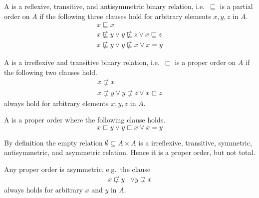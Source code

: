 

\begin{definition}
	A  is a reflexive, transitive, and antisymmetric binary relation,
	i.e.~\( \sqsubseteq \) is a partial order on \( A \) if
	the following three clauses hold for arbitrary elements \( x,y,z \) in \( A \).
	\begin{align*}
	x\sqsubseteq x
	\tag*{reflexivivity}
	\\
	x\not\sqsubseteq y \lor  y \not\sqsubseteq z \lor x\sqsubseteq z
	\tag*{transitivity}
	\\
	x\not\sqsubseteq y \lor y\not\sqsubseteq x \lor x = y
	\tag*{antisymmetry}
	\end{align*}
\end{definition}

\begin{definition}
	A  is a irreflexive and transitive binary relation,
	i.e.~\( \sqsubset \) is a proper order on \( A \) if the following two clauses hold.
	\begin{align*}
	x\not\sqsubset x
	\tag*{irreflexivivity}
	\\
	x\not\sqsubset y \lor  y \not\sqsubset z \lor x\sqsubset z
	\tag*{transitivity}
	\end{align*}
	always hold for arbitrary elements \( x,y,z \) in \( A \).
\end{definition}

\begin{definition}
	A  is a proper order where the following clause holds.
	\[
		x \sqsubset y \lor y \sqsubset x  \lor x=y \tag*{totality}
	\]
\end{definition}

\begin{example}
	By definition the empty relation \( \emptyset \subseteq A \times A \) is a
	irreflexive,
	transitive,
	symmetric,
	antisymmetric,
	and asymmetric
	relation.
	Hence it is a proper order, but not total.
\end{example}

\begin{lemma}
	Any proper order is asymmetric, e.g.~the clause
	\begin{align*}
	x\not\sqsubset y &\lor y\not\sqsubset x \tag*{asymmetry}
	\end{align*}
	always holds for arbitrary \( x \) and \( y \) in \( A \).
\end{lemma}

